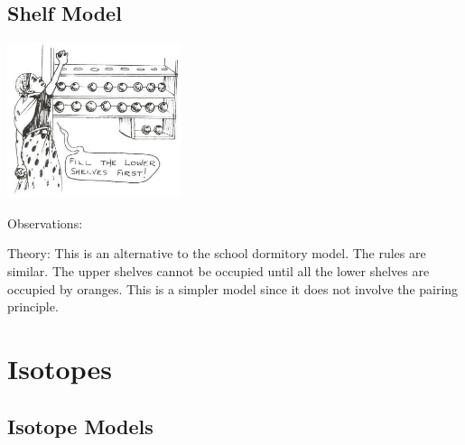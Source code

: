 \begin{multicols}{2}
\vfill
\columnbreak

\subsection{Shelf Model}

\begin{center}
\includegraphics[width=0.38\textwidth]{./img/source/shelf-model.jpg}
\end{center}

\begin{description*}
\item[Observations:]{}
\item[Theory:]{This is an alternative to the school dormitory
model. The rules are similar. The upper shelves cannot be occupied until all
the lower shelves are occupied by oranges.
This is a simpler model since it does not
involve the pairing principle.}
\end{description*}


\section*{Isotopes} 


\subsection{Isotope Models}


\end{multicols}
